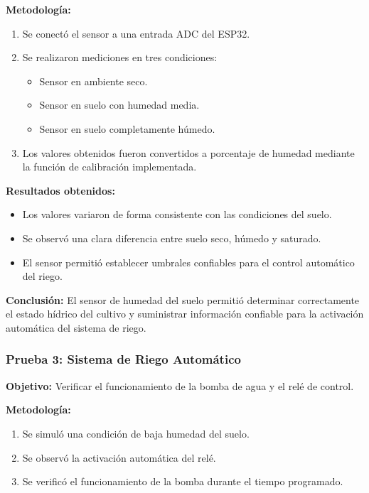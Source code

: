 \documentclass[conference]{IEEEtran}
\begin{document}
\textbf{Metodología:}
\begin{enumerate}
    \item Se conectó el sensor a una entrada ADC del ESP32.
    \item Se realizaron mediciones en tres condiciones:
    \begin{itemize}
        \item Sensor en ambiente seco.
        \item Sensor en suelo con humedad media.
        \item Sensor en suelo completamente húmedo.
    \end{itemize}
    \item Los valores obtenidos fueron convertidos a porcentaje de humedad mediante la función de calibración implementada.
\end{enumerate}

\textbf{Resultados obtenidos:}
\begin{itemize}
    \item Los valores variaron de forma consistente con las condiciones del suelo.
    \item Se observó una clara diferencia entre suelo seco, húmedo y saturado.
    \item El sensor permitió establecer umbrales confiables para el control automático del riego.
\end{itemize}

\textbf{Conclusión:}
El sensor de humedad del suelo permitió determinar correctamente el estado hídrico del cultivo y suministrar información confiable para la activación automática del sistema de riego.

\subsubsection{Prueba 3: Sistema de Riego Automático}

\textbf{Objetivo:}
Verificar el funcionamiento de la bomba de agua y el relé de control.

\textbf{Metodología:}
\begin{enumerate}
    \item Se simuló una condición de baja humedad del suelo.
    \item Se observó la activación automática del relé.
    \item Se verificó el funcionamiento de la bomba durante el tiempo programado.
\end{enumerate}
\end{document}
